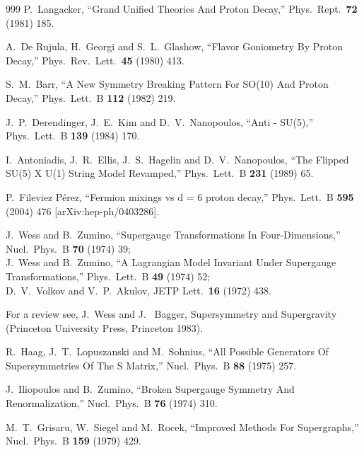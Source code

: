\begin{thebibliography}{999}
  P.~Langacker,
  ``Grand Unified Theories And Proton Decay,''
  Phys.\ Rept.\  {\bf 72} (1981) 185.

  A.~De Rujula, H.~Georgi and S.~L.~Glashow,
  ``Flavor Goniometry By Proton Decay,''
  Phys.\ Rev.\ Lett.\  {\bf 45} (1980) 413.

  S.~M.~Barr,
  ``A New Symmetry Breaking Pattern For SO(10) And Proton Decay,''
  Phys.\ Lett.\ B {\bf 112} (1982) 219.

  J.~P.~Derendinger, J.~E.~Kim and D.~V.~Nanopoulos,
  ``Anti - SU(5),''
  Phys.\ Lett.\ B {\bf 139} (1984) 170.

  I.~Antoniadis, J.~R.~Ellis, J.~S.~Hagelin and D.~V.~Nanopoulos,
  ``The Flipped SU(5) X U(1) String Model Revamped,''
  Phys.\ Lett.\ B {\bf 231} (1989) 65.

  P.~Fileviez P\'erez,
  ``Fermion mixings vs d = 6 proton decay,''
  Phys.\ Lett.\ B {\bf 595} (2004) 476
  [arXiv:hep-ph/0403286].

  J.~Wess and B.~Zumino,
  ``Supergauge Transformations In Four-Dimensions,''
  Nucl.\ Phys.\ B {\bf 70} (1974) 39;
\\
 J.~Wess and B.~Zumino,
  ``A Lagrangian Model Invariant Under Supergauge Transformations,''
  Phys.\ Lett.\ B {\bf 49} (1974) 52;
\\
 D.~V.~Volkov and V.~P.~Akulov,
  JETP Lett.\  {\bf 16} (1972) 438.

For a review see, 
J.~Wess  and J.~ Bagger, Supersymmetry and Supergravity (Princeton 
University Press, Princeton 1983).

  R.~Haag, J.~T.~Lopuszanski and M.~Sohnius,
  ``All Possible Generators Of Supersymmetries Of The S Matrix,''
  Nucl.\ Phys.\ B {\bf 88} (1975) 257.

  J.~Iliopoulos and B.~Zumino,
  ``Broken Supergauge Symmetry And Renormalization,''
  Nucl.\ Phys.\ B {\bf 76} (1974) 310.

  M.~T.~Grisaru, W.~Siegel and M.~Rocek,
  ``Improved Methods For Supergraphs,''
  Nucl.\ Phys.\ B {\bf 159} (1979) 429.


\end{thebibliography}
